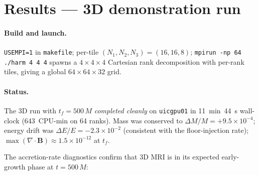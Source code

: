 \documentclass[11pt]{article}
\begin{document}
\section{Results --- 3D demonstration run}

\paragraph{Build and launch.} \texttt{USEMPI=1} in \texttt{makefile}; per-tile
$(N_1,N_2,N_3) = (16,16,8)$; \verb|mpirun -np 64 ./harm 4 4 4| spawns a
$4\times4\times4$ Cartesian rank decomposition with per-rank tiles, giving a global
$64\times64\times32$ grid.

\paragraph{Status.} The 3D run with $t_f = 500\,M$ \emph{completed cleanly} on
\texttt{uicgpu01} in 11~min~44~s wall-clock (643~CPU-min on 64 ranks). Mass was
conserved to $\Delta M/M = +9.5\times10^{-4}$; energy drift was
$\Delta E/E = -2.3 \times 10^{-2}$ (consistent with the floor-injection rate);
$\max(\nabla\cdot\mathbf{B}) \approx 1.5\times 10^{-12}$ at $t_f$.

The accretion-rate diagnostics confirm that 3D MRI is in its expected early-growth
phase at $t = 500\,M$:
\end{document}
